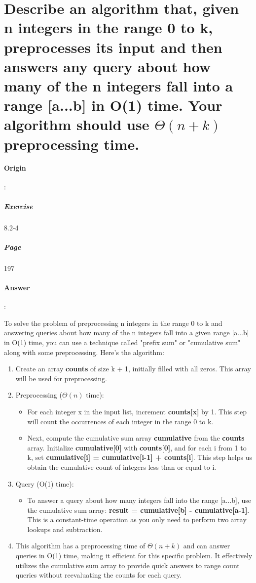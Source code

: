 \documentclass{article}
\begin{document}
  \section{Describe an algorithm that, given n integers in the range 0 to k, preprocesses its input and then answers any query about how many of the n integers fall into a range [a...b] in O(1) time. Your algorithm should use $\Theta(n+k)$ preprocessing time.}
  \paragraph{Origin}:
    \subparagraph{Exercise}8.2-4
    \subparagraph{Page}197
  \paragraph{Answer}:


To solve the problem of preprocessing n integers in the range 0 to k and answering queries about how many of the n integers fall into a given range [a...b] in O(1) time, you can use a technique called "prefix sum" or "cumulative sum" along with some preprocessing. Here's the algorithm:

\begin{enumerate}
  \item Create an array \textbf{counts} of size k + 1, initially filled with all zeros. This array will be used for preprocessing.
  \item Preprocessing ($\Theta(n)$ time):
  \begin{itemize}
    \item For each integer x in the input list, increment \textbf{counts[x]} by 1. This step will count the occurrences of each integer in the range 0 to k.
    \item Next, compute the cumulative sum array \textbf{cumulative} from the \textbf{counts} array. Initialize \textbf{cumulative[0]} with \textbf{counts[0]}, and for each i from 1 to k, set \textbf{cumulative[i] = cumulative[i-1] + counts[i]}. This step helps us obtain the cumulative count of integers less than or equal to i.
  \end{itemize}
  \item Query (O(1) time):
  \begin{itemize}
    \item To answer a query about how many integers fall into the range [a...b], use the cumulative sum array: \textbf{result = cumulative[b] - cumulative[a-1]}. This is a constant-time operation as you only need to perform two array lookups and subtraction.
  \end{itemize}
  \item This algorithm has a preprocessing time of $\Theta(n + k)$ and can answer queries in O(1) time, making it efficient for this specific problem. It effectively utilizes the cumulative sum array to provide quick answers to range count queries without reevaluating the counts for each query.
\end{enumerate}
\end{document}

